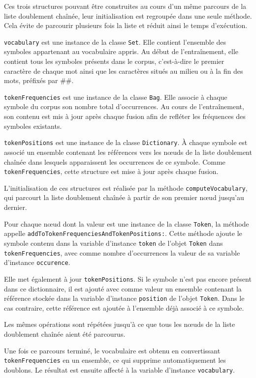 \documentclass[12pt,a4paper]{report}
\begin{document}
\begin{enumerate}
	Ces trois structures pouvant être construites au cours d'un même parcours de la liste doublement chaînée, leur initialisation est regroupée dans une seule méthode. Cela évite de parcourir plusieurs fois la liste et réduit ainsi le temps d'exécution.
	
	\texttt{vocabulary} est une instance de la classe \texttt{Set}. Elle contient l'ensemble des symboles appartenant au vocabulaire appris. Au début de l'entraînement, elle contient tous les symboles présents dans le corpus, c'est-à-dire le premier caractère de chaque mot ainsi que les caractères situés au milieu ou à la fin des mots, préfixés par \#\#.
	
	\texttt{tokenFrequencies} est une instance de la classe \texttt{Bag}. Elle associe à chaque symbole du corpus son nombre total d'occurrences. Au cours de l'entraînement, son contenu est mis à jour après chaque fusion afin de refléter les fréquences des symboles existants.
	
	\texttt{tokenPositions} est une instance de la classe \texttt{Dictionary}. À chaque symbole est associé un ensemble contenant les références vers les nœuds de la liste doublement chaînée dans lesquels apparaissent les occurrences de ce symbole. Comme \texttt{tokenFrequencies}, cette structure est mise à jour après chaque fusion.
	
	L'initialisation de ces structures est réalisée par la méthode \texttt{computeVocabulary}, qui parcourt la liste doublement chaînée à partir de son premier nœud jusqu'au dernier.
	
	Pour chaque nœud dont la valeur est une instance de la classe \texttt{Token}, la méthode appelle \texttt{addToTokenFrequenciesAndTokenPositions:}. Cette méthode ajoute le symbole contenu dans la variable d'instance \texttt{token} de l'objet \texttt{Token} dans \texttt{tokenFrequencies}, avec comme nombre d'occurrences la valeur de sa variable d'instance \texttt{occurence}.
	
	Elle met également à jour \texttt{tokenPositions}. Si le symbole n'est pas encore présent dans ce dictionnaire, il est ajouté avec comme valeur un ensemble contenant la référence stockée dans la variable d'instance \texttt{position} de l'objet \texttt{Token}. Dans le cas contraire, cette référence est ajoutée à l'ensemble déjà associé à ce symbole.
	
	Les mêmes opérations sont répétées jusqu'à ce que tous les nœuds de la liste doublement chaînée aient été parcourus.
	
	Une fois ce parcours terminé, le vocabulaire est obtenu en convertissant \texttt{tokenFrequencies} en un ensemble, ce qui supprime automatiquement les doublons. Le résultat est ensuite affecté à la variable d'instance \texttt{vocabulary}.
	

\end{enumerate}
\end{document}
